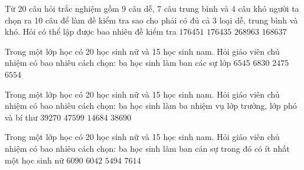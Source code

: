 \begin{ex}
	Từ 20 câu hỏi trắc nghiệm gồm 9 câu dễ, 7 câu trung bình và 4 câu khó người ta chọn ra 10 câu để làm đề kiểm tra sao cho phải có đủ cả 3 loại dễ, trung bình và khó. Hỏi có thể lập được bao nhiêu đề kiểm tra
	\choice
	{\True $176451$}
	{$176435$}
	{$268963$}
	{$168637$}
\end{ex}

\begin{ex}
	Trong một lớp học có 20 học sinh nữ và 15 học sinh nam. Hỏi giáo viên chủ nhiệm có bao nhiêu cách chọn: ba học sinh làm ban các sự lớp
	\choice
	{\True $6545$}
	{$6830$}
	{$2475$}
	{$6554$}
\end{ex}

\begin{ex}
	Trong một lớp học có 20 học sinh nữ và 15 học sinh nam. Hỏi giáo viên chủ nhiệm có bao nhiêu cách chọn: ba học sinh làm ba nhiệm vụ lớp trưởng, lớp phó và bí thư
	\choice
	{\True $39270$}
	{$47599$}
	{$14684$}
	{$38690$}
\end{ex}

\begin{ex}
	Trong một lớp học có 20 học sinh nữ và 15 học sinh nam. Hỏi giáo viên chủ nhiệm có bao nhiêu cách chọn: ba học sinh làm ban cán sự trong đó có ít nhất một học sinh nữ
	\choice
	{\True $6090$}
	{$6042$}
	{$5494$}
	{$7614$}
\end{ex}

